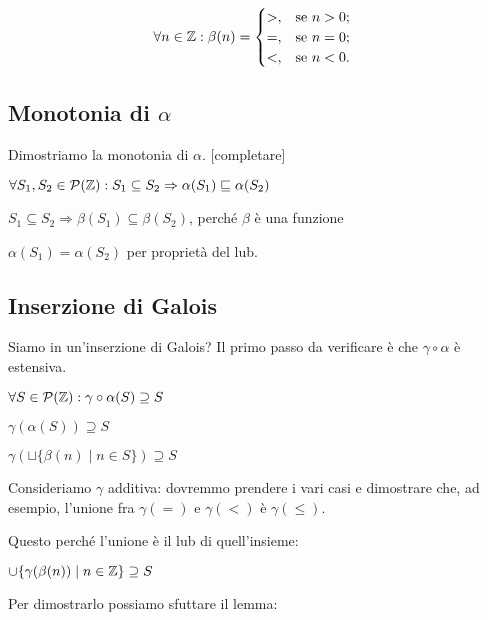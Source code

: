 \begin{align*}
	\forall n \in \mathbb{Z}: \beta(n) &=
	\begin{cases}
		>,	&\text{se $n  >  0$;} \\
		=,	&\text{se $n = 0$;} \\
		<,	&\text{se $n < 0$.}
	\end{cases} 
\end{align*}

\subsection{Monotonia di $\alpha$}
Dimostriamo la monotonia di $\alpha$.
[completare]
\begin{center}
	$ \forall S_1, S_2 \in \mathcal{P}(\mathbb{Z}) : S_1 \subseteq S_2 \Rightarrow \alpha(S_1) \sqsubseteq \alpha(S_2) $
\end{center}
\begin{center}
	$ S_1 \subseteq S_2 \Rightarrow \beta(S_1) \subseteq \beta(S_2) $, perché $\beta$ è  una funzione
\end{center}
\begin{center}
	$ \alpha(S_1) = \alpha(S_2) $ per proprietà del lub.
\end{center}

\subsection{Inserzione di Galois}
Siamo in un'inserzione di Galois? Il primo passo da verificare è che $\gamma \circ \alpha$ è estensiva. 

\begin{center}
	$ \forall S \in \mathcal{P}(\mathbb{Z}) : \gamma \circ \alpha(S) \supseteq S $
\end{center}

\begin{center}
	$ \gamma(\alpha(S)) \supseteq S $
\end{center}

\begin{center}
	$ \gamma(\sqcup \{ \beta(n) \mid n \in S \} ) \supseteq S $
\end{center}

Consideriamo $\gamma$ additiva: dovremmo prendere i vari casi e dimostrare che, ad esempio, l'unione fra $\gamma(=)$ e $\gamma(<)$ è $\gamma(\leq)$.

Questo perché l'unione è il lub di quell'insieme:

\begin{center}
	$ \cup \{ \gamma(\beta(n)) \mid n \in \mathbb{Z} \} \supseteq S $
\end{center}
Per dimostrarlo possiamo sfuttare il lemma:

